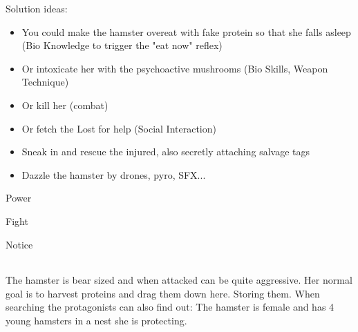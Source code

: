 Solution ideas:
\begin{itemize}
\item You could make the hamster overeat with fake protein so that she falls asleep (Bio
Knowledge to trigger the "eat now" reflex)
\item Or intoxicate her with the psychoactive mushrooms (Bio Skills, Weapon Technique)
\item Or kill her (combat)
\item Or fetch the Lost for help (Social Interaction)
\item Sneak in and rescue the injured, also secretly attaching salvage tags
\item Dazzle the hamster by drones, pyro, SFX...
\end{itemize}


\begin{npcBox}[title=Hamster]

    \begin{aspects}
    \item {}
    \item {}
    \item {}
    \end{aspects}
    
    \begin{skills}
    \item {} Power
    \item {} Fight
    \item {} Notice
    \end{skills}
    
    \begin{stunts}
    \item {}
    \end{stunts}
    
    \begin{stressSection}
    \end{stressSection}
    \begin{tabularx}{\textwidth}{ XX }
    \end{tabularx}
    
    \begin{consequences}
    \item {}
    \item {}
    \item {}
    \end{consequences}
    
    \begin{npcDescription}
    The hamster is bear sized and when attacked can be quite aggressive. Her normal goal is to harvest proteins and drag them down here. Storing them. When searching the protagonists can also find out: The hamster is female and has 4 young hamsters in a nest she is protecting.
    \end{npcDescription}
    
\end{npcBox}
